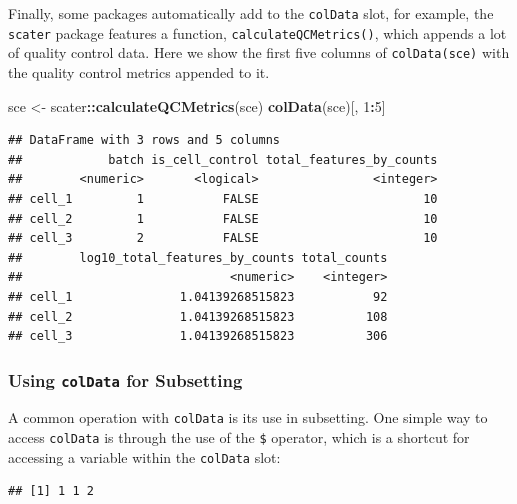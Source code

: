 \documentclass[]{book}
\newenvironment{Shaded}{\begin{snugshade}}{\end{snugshade}}
\newcommand{\DecValTok}[1]{\textcolor[rgb]{0.00,0.00,0.81}{#1}}
\newcommand{\KeywordTok}[1]{\textcolor[rgb]{0.13,0.29,0.53}{\textbf{#1}}}
\newcommand{\NormalTok}[1]{#1}
\newcommand{\OperatorTok}[1]{\textcolor[rgb]{0.81,0.36,0.00}{\textbf{#1}}}
\newcommand{\StringTok}[1]{\textcolor[rgb]{0.31,0.60,0.02}{#1}}
\begin{document}
Finally, some packages automatically add to the \texttt{colData} slot, for example, the \texttt{scater} package features a function, \texttt{calculateQCMetrics()}, which appends a lot of quality control data. Here we show the first five columns of \texttt{colData(sce)} with the quality control metrics appended to it.

\begin{Shaded}
\begin{Highlighting}[]
\NormalTok{sce <-}\StringTok{ }\NormalTok{scater}\OperatorTok{::}\KeywordTok{calculateQCMetrics}\NormalTok{(sce)}
\KeywordTok{colData}\NormalTok{(sce)[, }\DecValTok{1}\OperatorTok{:}\DecValTok{5}\NormalTok{]}
\end{Highlighting}
\end{Shaded}

\begin{verbatim}
## DataFrame with 3 rows and 5 columns
##            batch is_cell_control total_features_by_counts
##        <numeric>       <logical>                <integer>
## cell_1         1           FALSE                       10
## cell_2         1           FALSE                       10
## cell_3         2           FALSE                       10
##        log10_total_features_by_counts total_counts
##                             <numeric>    <integer>
## cell_1               1.04139268515823           92
## cell_2               1.04139268515823          108
## cell_3               1.04139268515823          306
\end{verbatim}

\hypertarget{using-coldata-for-subsetting}{%
\subsubsection{\texorpdfstring{Using \texttt{colData} for Subsetting}{Using colData for Subsetting}}\label{using-coldata-for-subsetting}}

A common operation with \texttt{colData} is its use in subsetting. One simple way to access \texttt{colData} is through the use of the \texttt{\$} operator, which is a shortcut for accessing a variable within the \texttt{colData} slot:

\begin{Shaded}
\end{Shaded}

\begin{verbatim}
## [1] 1 1 2
\end{verbatim}
\end{document}
